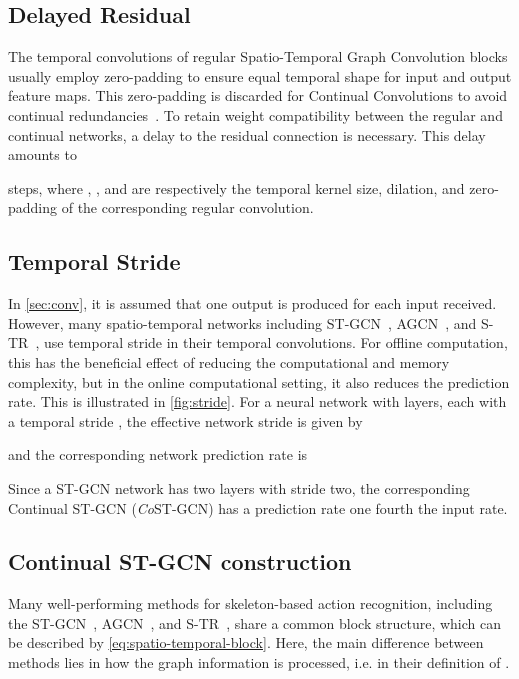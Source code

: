 \documentclass[journal]{IEEEtran}
\theoremstyle{definition}
\begin{document}
\subsection{Delayed Residual}
The temporal convolutions of regular Spatio-Temporal Graph Convolution blocks usually employ zero-padding to ensure equal temporal shape for input and output feature maps.
This zero-padding is discarded for Continual Convolutions to avoid continual redundancies~\cite{hedegaard2021continual}.
To retain weight compatibility between the regular and continual networks, a delay to the residual connection is necessary. This delay amounts to

steps, where , , and  are respectively the temporal kernel size, dilation, and zero-padding of the corresponding regular convolution.


\subsection{Temporal Stride}\label{sec:stride}
In \cref{sec:conv}, it is assumed that one output is produced for each input received.
However, many spatio-temporal networks including ST-GCN~\cite{yan2018spatial}, AGCN~\cite{shi2019two}, and S-TR~\cite{plizzari2021skeleton}, use temporal stride  in their temporal convolutions.
For offline computation, this has the beneficial effect of reducing the computational and memory complexity, but in the online computational setting, it also reduces the prediction rate. This is illustrated in \cref{fig:stride}.
For a neural network with  layers, each with a temporal stride , the effective network stride is given by

and the corresponding network prediction rate is

Since a ST-GCN network has two layers with stride two, the corresponding Continual ST-GCN (\textit{Co}ST-GCN) has a prediction rate one fourth the input rate.


\subsection{Continual ST-GCN construction}\label{sec:continual-st-gcn}
Many well-performing methods for skeleton-based action recognition, including the ST-GCN~\cite{yan2018spatial}, AGCN~\cite{shi2019two}, and S-TR~\cite{plizzari2021skeleton}, share a common block structure, which can be described by \cref{eq:spatio-temporal-block}.
Here, the main difference between methods lies in how the graph information is processed, i.e. in their definition of . 
\end{document}
